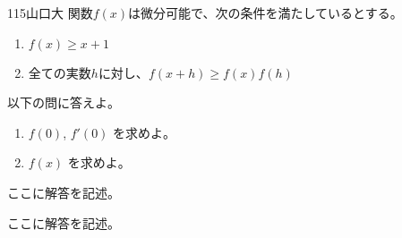 \begin{thm}{115}{}{山口大}
 関数$f(x)$は微分可能で、次の条件を満たしているとする。
 \begin{enumerate}
  \renewcommand{\labelenumi}{(\alph{enumi})}
  \item $f(x)\ge x+1$
  \item 全ての実数$h$に対し、$f(x+h)\ge f(x)f(h)$
 \end{enumerate}
 以下の問に答えよ。
 \begin{enumerate}
  \item $f(0)$, $f'(0)$ を求めよ。
  \item $f(x)$ を求めよ。
 \end{enumerate}
\end{thm}

ここに解答を記述。

ここに解答を記述。